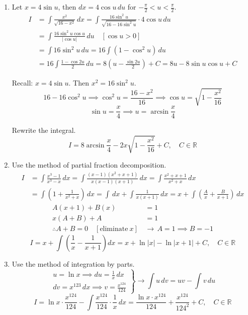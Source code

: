 \documentclass[a4paper, 12pt]{article}
\begin{document}
\begin{enumerate}[leftmargin=*,label=\textbf{\arabic*.}]
\begin{enumerate}[leftmargin=*,label=\textbf{\alph*.}]
Let $u=\sin x$, then $du=\cos x\,dx$.
\begin{align*}
I&=\int\cos x\cdot\left(1-\sin^2x\right)\cdot\sin^2x\,dx=\int\left(1-u^2\right) u^2\,du=\int\left(u^2-u^4\right)\,du\\[1em]&=\frac{u^3}3-\frac{u^5}5+C=\boxed{\frac{\sin^3x}3-\frac{\sin^5x}5+C}
\end{align*}

\item Let $x=4\sin u$, then $dx=4\cos u\,du$ for $\displaystyle -\frac\pi2<u<\frac\pi2$.
\begin{align*}
I&=\int\frac{x^2}{\sqrt{16-x^2}}\,dx=\int\frac{16\sin^2u}{\sqrt{16-16\sin^2u}}\cdot4\cos u\,du\\[1em]&=\int\frac{16\sin^2u\cos u}{\left|\cos u\right|}\,du\quad\left[\cos u>0\right]\\[1em]&=\int16\sin^2u\,du=16\int\left(1-\cos^2u\right)\,du\\[1em]&=16\int\frac{1-\cos2u}2\,du=8\left(u-\frac{\sin2u}2\right)+C=8u-8\sin u\cos u+C
\end{align*}

Recall: $x=4\sin u$. Then $x^2=16\sin^2u$.
\[16-16\cos^2u\implies\cos^2u=\frac{16-x^2}{16}\implies\cos u=\sqrt{1-\frac{x^2}{16}}\]
\[\sin u=\frac{x}4\implies u=\arcsin\frac x4\]

Rewrite the integral.
\[\boxed{I=8\arcsin\frac x4-2x\sqrt{1-\frac{x^2}{16}}+C,\quad C\in\mathbb{R}}\]

\item Use the method of partial fraction decomposition.
\begin{align*}
I&=\int\frac{x^3-1}{x^3-x}\,dx=\int\frac{(x-1)\left(x^2+x+1\right)}{x(x-1)(x+1)}\,dx=\int\frac{x^2+x+1}{x^2+x}\,dx\\[1em]&=\int\left(1+\frac1{x^2+x}\right)\,dx=\int\,dx+\int\frac1{x(x+1)}\,dx=x+\int\left(\frac A{x}+\frac B{x+1}\right)\,dx
\end{align*}
\begin{align*}
A(x+1)+B(x)&=1\\
x(A+B)+A&=1\\
\therefore A+B=0\quad[\text{eliminate}\:x]\,&\rightarrow\,A=1\implies B=-1
\end{align*}
\[I=x+\int\left(\frac1x-\frac1{x+1}\right)dx=\boxed{x+\ln\left|x\right|-\ln\left|x+1\right|+C,\quad C\in\mathbb{R}}\]

\item Use the method of integration by parts.
\[\left.\begin{array}{c}
\displaystyle u=\ln x\implies du=\frac1x\,dx\\[1em]
\displaystyle dv=x^{123}\,dx\implies v=\frac{x^{124}}{124}
\end{array}\right\}\rightarrow\int u\,dv=uv-\int v\,du\]
\[I=\ln x\cdot\frac{x^{124}}{124}-\int\frac{x^{124}}{124}\cdot\frac1x\,dx=\boxed{\frac{\ln x\cdot x^{124}}{124}+\frac{x^{124}}{124^2}+C,\quad C\in\mathbb{R}}\]
\end{enumerate}


\end{enumerate}
\end{document}
